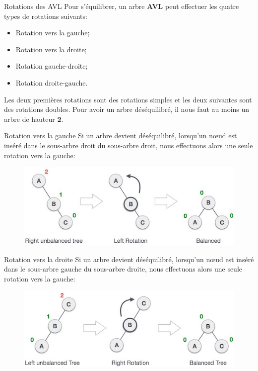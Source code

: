 \documentclass[10pt,xcolor=dvipsnames]{beamer}
\newcommand{\defin}[1]{\textcolor{darkspringgreen}{#1}}
\begin{document}
\begin{frame}{Rotations des AVL}
    Pour s'équilibrer, un arbre \defin{\textbf{AVL}} peut effectuer les quatre types de rotations suivants:


\begin{itemize}
    \item Rotation vers la \alert{gauche};
    \item Rotation vers la \alert{droite};
    \item Rotation \alert{gauche-droite};
    \item Rotation \alert{droite-gauche}.
\end{itemize}
    

Les deux premières rotations sont des rotations simples et les deux suivantes sont des rotations doubles. Pour avoir un arbre déséquilibré, il nous faut au moins un arbre de hauteur \textbf{2}.
\end{frame}

\begin{frame}{Rotation vers la gauche}
    Si un arbre devient déséquilibré, lorsqu'un nœud est inséré dans le sous-arbre droit du sous-arbre droit, nous effectuons alors une seule rotation vers la gauche:
    
    \begin{figure}
        \centering
        \includegraphics[scale=0.5]{figures/CM3/avl-gauche.jpg}
        \label{fig:my_label}
    \end{figure}
\end{frame}

\begin{frame}{Rotation vers la droite}
    Si un arbre devient déséquilibré, lorsqu'un nœud est inséré dans le sous-arbre gauche du sous-arbre droite, nous effectuons alors une seule rotation vers la gauche:
    
        \begin{figure}
        \centering
        \includegraphics[scale=0.5]{figures/CM3/avl-droit.jpg}
        \label{fig:my_label}
    \end{figure}
\end{frame}
\end{document}
